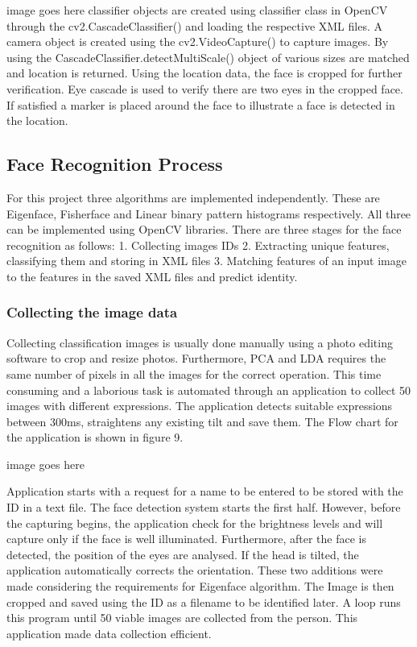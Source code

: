 \documentclass[11pt]{article}
\begin{document}
image goes here
classifier objects are created using classifier class in OpenCV through the cv2.CascadeClassifier() and
loading the respective XML files. A camera object is created using the cv2.VideoCapture() to capture
images. By using the CascadeClassifier.detectMultiScale() object of various sizes are matched and
location is returned. Using the location data, the face is cropped for further verification. Eye cascade is
used to verify there are two eyes in the cropped face. If satisfied a marker is placed around the face to
illustrate a face is detected in the location.
\subsection{Face Recognition Process}
For this project three algorithms are implemented independently. These are Eigenface, Fisherface and
Linear binary pattern histograms respectively. All three can be implemented using OpenCV libraries.
There are three stages for the face recognition as follows:
1. Collecting images IDs
2. Extracting unique features, classifying them and storing in XML files
3. Matching features of an input image to the features in the saved XML files and predict identity.
\subsubsection{Collecting the image data}
Collecting classification images is usually done manually using a photo editing software to crop and
resize photos. Furthermore, PCA and LDA requires the same number of pixels in all the images for the
correct operation. This time consuming and a laborious task is automated through an application to
collect 50 images with different expressions. The application detects suitable expressions between 300ms,
straightens any existing tilt and save them. The Flow chart for the application is shown in figure 9.

image goes here

Application starts with a request for a name to be entered to be stored with the ID in a text file. The
face detection system starts the first half. However, before the capturing begins, the application check for
the brightness levels and will capture only if the face is well illuminated. Furthermore, after the face is
detected, the position of the eyes are analysed. If the head is tilted, the application automatically corrects
the orientation. These two additions were made considering the requirements for Eigenface algorithm.
The Image is then cropped and saved using the ID as a filename to be identified later. A loop runs
this program until 50 viable images are collected from the person. This application made data collection
efficient.
\end{document}

